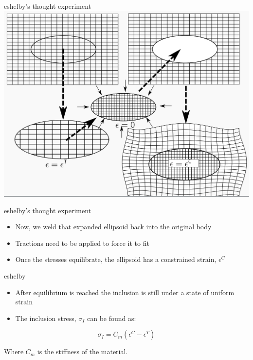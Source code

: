 \documentclass[
  letterpaper,
  ignorenonframetext,
  aspectratio=43,
  handout,
  12pt]{beamer}
\providecommand{\tightlist}{%
  \setlength{\itemsep}{0pt}\setlength{\parskip}{0pt}}
\providecommand{\tightlist}{%
\setlength{\itemsep}{0pt}\setlength{\parskip}{0pt}}
\let\Oldincludegraphics\includegraphics
\renewcommand{\includegraphics}[2][]{\Oldincludegraphics[width=\textwidth,height=0.7\textheight,keepaspectratio]{#2}}
\begin{document}
\begin{frame}{eshelby's thought experiment}
\protect\hypertarget{eshelbys-thought-experiment-1}{}
\includegraphics{../images/eshelby.png}
\end{frame}

\begin{frame}{eshelby's thought experiment}
\protect\hypertarget{eshelbys-thought-experiment-2}{}
\begin{itemize}
\tightlist
\item
  Now, we weld that expanded ellipsoid back into the original body
\item
  Tractions need to be applied to force it to fit
\item
  Once the stresses equilibrate, the ellipsoid has a constrained strain,
  \(\epsilon^C\)
\end{itemize}
\end{frame}

\begin{frame}{eshelby}
\protect\hypertarget{eshelby-1}{}
\begin{itemize}
\tightlist
\item
  After equilibrium is reached the inclusion is still under a state of
  uniform strain
\item
  The inclusion stress, \(\sigma_I\) can be found as:
\end{itemize}

\[\sigma_I = C_m (\epsilon^C - \epsilon^T)\]

Where \(C_m\) is the stiffness of the material.
\end{frame}
\end{document}
